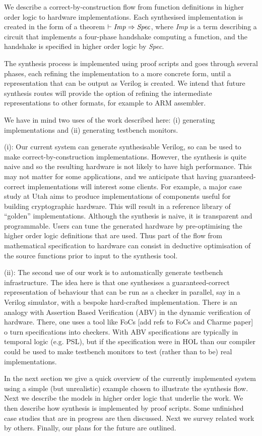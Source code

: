 
We describe a correct-by-construction flow from function definitions
in higher order logic to hardware implementations.  Each synthesised
implementation is created in the form of a theorem
$\vdash {\it{Imp}}\Rightarrow{\it{Spec}}$, where {\it{Imp}} is
a term describing a circuit that implements a four-phase handshake
computing a function, and the handshake is specified in higher order logic by
{\it{Spec}}. 

The synthesis process is implemented using proof
scripts and goes through several phases, each refining the
implementation to a more concrete form, until a representation that
can be output as Verilog is created. We intend that future synthesis
routes will provide the option of refining the intermediate
representations to other formats, for example to ARM assembler.

We have in mind two uses of the work described here: (i) generating
implementations and (ii) generating testbench monitors.

(i): Our current system can generate synthesisable Verilog, so can be
used to make correct-by-construction implementations. However, the
synthesis is quite naive and so the resulting hardware is not likely
to have high performance. This may not matter for some applications,
and we anticipate that having guaranteed-correct implementations will
interest some clients. For example, a major case study at Utah aims to
produce implementations of components useful for building
cryptographic hardware.  This will result in a reference library of ``golden''
implementations. Although the synthesis is naive, it is transparent
and programmable. Users can tune the generated hardware by
pre-optimising the higher order logic definitions that are used. Thus
part of the flow from mathematical specification to hardware can
consist in deductive optimisation of the source functions prior to
input to the synthesis tool.

(ii): The second use of our work is to automatically generate testbench
infrastructure. The idea here is that one synthesises a
guaranteed-correct representation of behaviour that can be run as a checker in
parallel, say in a Verilog simulator, with a bespoke hard-crafted
implementation. There is an analogy with
Assertion Based Verification (ABV) in the dynamic verification of
hardware. There, one uses a tool like FoCs [add refs to FoCs and Charme paper] 
o turn specifications into checkers.  With ABV specifications
are typically in temporal logic (e.g.{} PSL), but if the specification
were in HOL than our compiler could be used to make
testbench monitors to test (rather than to be) real implementations.

In the next section we give a quick overview of the currently
implemented system using a simple (but unrealistic) example chosen to
illustrate the synthesis flow.  Next we describe the models in higher
order logic that underlie the work. We then describe how synthesis is
implemented by proof scripts. Some unfinished case studies that are in
progress are then discussed. Next we survey related work by
others. Finally, our plans for the future are outlined.

